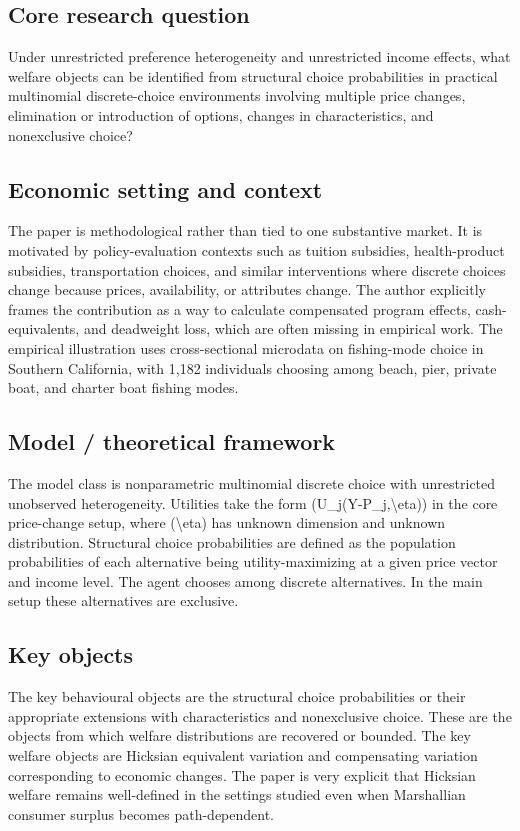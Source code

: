 \documentclass[11pt,a4paper]{article}
\begin{document}
\subsection*{Core research question}
Under unrestricted preference heterogeneity and unrestricted income effects, what welfare objects can be identified from structural choice probabilities in practical multinomial discrete-choice environments involving multiple price changes, elimination or introduction of options, changes in characteristics, and nonexclusive choice?

\subsection*{Economic setting and context}
The paper is methodological rather than tied to one substantive market. It is motivated by policy-evaluation contexts such as tuition subsidies, health-product subsidies, transportation choices, and similar interventions where discrete choices change because prices, availability, or attributes change. The author explicitly frames the contribution as a way to calculate compensated program effects, cash-equivalents, and deadweight loss, which are often missing in empirical work. The empirical illustration uses cross-sectional microdata on fishing-mode choice in Southern California, with 1,182 individuals choosing among beach, pier, private boat, and charter boat fishing modes.

\subsection*{Model / theoretical framework}
The model class is nonparametric multinomial discrete choice with unrestricted unobserved heterogeneity. Utilities take the form (U\_j(Y-P\_j,\textbackslash{}eta)) in the core price-change setup, where (\textbackslash{}eta) has unknown dimension and unknown distribution. Structural choice probabilities are defined as the population probabilities of each alternative being utility-maximizing at a given price vector and income level. The agent chooses among discrete alternatives. In the main setup these alternatives are exclusive.

\subsection*{Key objects}
The key behavioural objects are the structural choice probabilities or their appropriate extensions with characteristics and nonexclusive choice. These are the objects from which welfare distributions are recovered or bounded. The key welfare objects are Hicksian equivalent variation and compensating variation corresponding to economic changes. The paper is very explicit that Hicksian welfare remains well-defined in the settings studied even when Marshallian consumer surplus becomes path-dependent.
\end{document}
